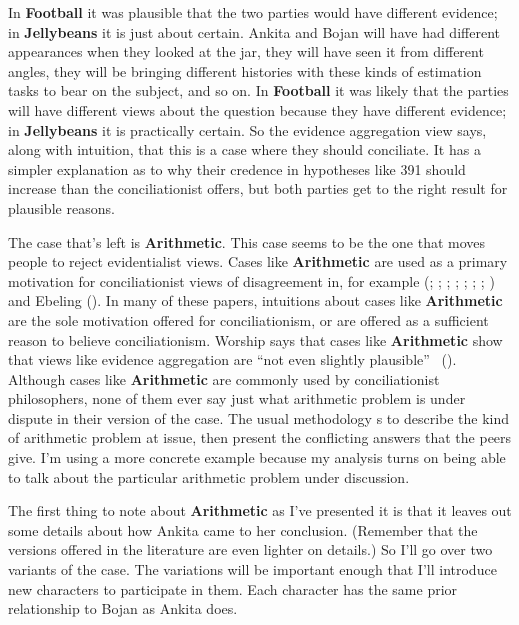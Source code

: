 \documentclass[
  10pt,
  letterpaper,
  twoside]{scrbook}
\begin{document}
In \textbf{Football} it was plausible that the two parties would have
different evidence; in \textbf{Jellybeans} it is just about certain.
{Ankita} and {Bojan} will have had different appearances when they
looked at the jar, they will have seen it from different angles, they
will be bringing different histories with these kinds of estimation
tasks to bear on the subject, and so on. In \textbf{Football} it was
likely that the parties will have different views about the question
because they have different evidence; in \textbf{Jellybeans} it is
practically certain. So the evidence aggregation view says, along with
intuition, that this is a case where they should conciliate. It has a
simpler explanation as to why their credence in hypotheses like 391
should increase than the conciliationist offers, but both parties get to
the right result for plausible reasons.

The case that's left is \textbf{Arithmetic}. This case seems to be the
one that moves people to reject evidentialist views. Cases like
\textbf{Arithmetic} are used as a primary motivation for conciliationist
views of disagreement in, for example
(;
;
; ; ;
;
;
) and Ebeling
(). In many of these papers, intuitions
about cases like \textbf{Arithmetic} are the sole motivation offered for
conciliationism, or are offered as a sufficient reason to believe
conciliationism. Worship says that cases like \textbf{Arithmetic} show
that views like evidence aggregation are ``not even slightly plausible''
~(). Although cases like
\textbf{Arithmetic} are commonly used by conciliationist philosophers,
none of them ever say just what arithmetic problem is under dispute in
their version of the case. The usual methodology s to describe the kind
of arithmetic problem at issue, then present the conflicting answers
that the peers give. I'm using a more concrete example because my
analysis turns on being able to talk about the particular arithmetic
problem under discussion.

The first thing to note about \textbf{Arithmetic} as I've presented it
is that it leaves out some details about how {Ankita} came to her
conclusion. (Remember that the versions offered in the literature are
even lighter on details.) So I'll go over two variants of the case. The
variations will be important enough that I'll introduce new characters
to participate in them. Each character has the same prior relationship
to {Bojan} as {Ankita} does.
\end{document}
